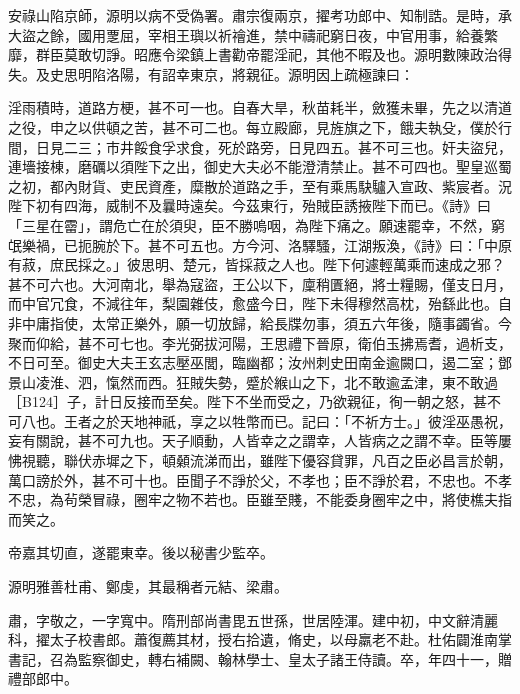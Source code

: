 \begin{pinyinscope}
 安祿山陷京師，源明以病不受偽署。肅宗復兩京，擢考功郎中、知制誥。是時，承大盜之餘，國用覂屈，宰相王璵以祈禬進，禁中禱祀窮日夜，中官用事，給養繁靡，群臣莫敢切諍。昭應令梁鎮上書勸帝罷淫祀，其他不暇及也。源明數陳政治得失。及史思明陷洛陽，有詔幸東京，將親征。源明因上疏極諫曰：



 淫雨積時，道路方梗，甚不可一也。自春大旱，秋苗耗半，斂獲未畢，先之以清道之役，申之以供頓之苦，甚不可二也。每立殿廊，見旌旗之下，餓夫執殳，僕於行間，日見二三；市井餒食孚求食，死於路旁，日見四五。甚不可三也。奸夫盜兒，連墻接棟，磨礪以須陛下之出，御史大夫必不能澄清禁止。甚不可四也。聖皇巡蜀之初，都內財貨、吏民資產，糜散於道路之手，至有乘馬駃驢入宣政、紫宸者。況陛下初有四海，威制不及曩時遠矣。今茲東行，殆賊臣誘掖陛下而已。《詩》曰「三星在霤」，謂危亡在於須臾，臣不勝嗚咽，為陛下痛之。願速罷幸，不然，窮氓樂禍，已扼腕於下。甚不可五也。方今河、洛驛騷，江湖叛渙，《詩》曰：「中原有菽，庶民採之。」彼思明、楚元，皆採菽之人也。陛下何遽輕萬乘而速成之邪？甚不可六也。大河南北，舉為寇盜，王公以下，廩稍匱絕，將士糧賜，僅支日月，而中官冗食，不減往年，梨園雜伎，愈盛今日，陛下未得穆然高枕，殆繇此也。自非中庸指使，太常正樂外，願一切放歸，給長牒勿事，須五六年後，隨事蠲省。今聚而仰給，甚不可七也。李光弼拔河陽，王思禮下晉原，衛伯玉拂焉耆，過析支，不日可至。御史大夫王玄志壓巫閭，臨幽都；汝州刺史田南金逾闕口，遏二室；鄧景山凌淮、泗，愾然而西。狂賊失勢，蹙於緱山之下，北不敢逾孟津，東不敢過［B124］子，計日反接而至矣。陛下不坐而受之，乃欲親征，徇一朝之怒，甚不可八也。王者之於天地神祇，享之以牲幣而已。記曰：「不祈方士。」彼淫巫愚祝，妄有關說，甚不可九也。天子順動，人皆幸之之謂幸，人皆病之之謂不幸。臣等屢怫視聽，聯伏赤墀之下，頓顙流涕而出，雖陛下優容貸罪，凡百之臣必昌言於朝，萬口謗於外，甚不可十也。臣聞子不諍於父，不孝也；臣不諍於君，不忠也。不孝不忠，為茍榮冒祿，圈牢之物不若也。臣雖至賤，不能委身圈牢之中，將使樵夫指而笑之。



 帝嘉其切直，遂罷東幸。後以秘書少監卒。



 源明雅善杜甫、鄭虔，其最稱者元結、梁肅。



 肅，字敬之，一字寬中。隋刑部尚書毘五世孫，世居陸渾。建中初，中文辭清麗科，擢太子校書郎。蕭復薦其材，授右拾遺，脩史，以母羸老不赴。杜佑闢淮南掌書記，召為監察御史，轉右補闕、翰林學士、皇太子諸王侍讀。卒，年四十一，贈禮部郎中。



\end{pinyinscope}